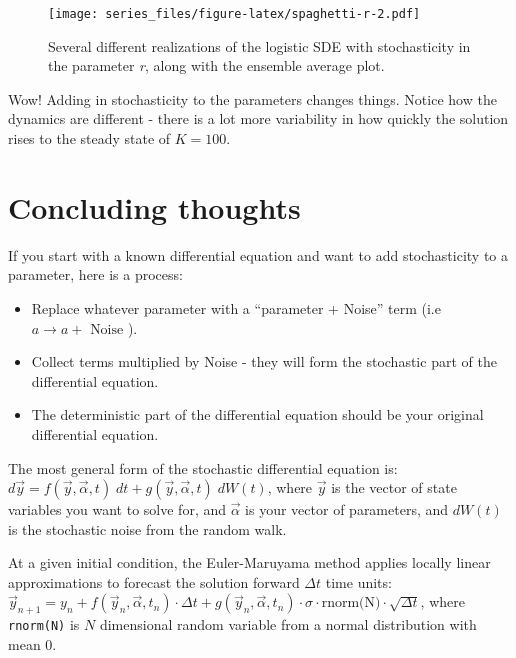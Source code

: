 \documentclass[
]{book}
\providecommand{\tightlist}{%
  \setlength{\itemsep}{0pt}\setlength{\parskip}{0pt}}
\theoremstyle{definition}
\theoremstyle{definition}
\theoremstyle{definition}
\theoremstyle{remark}
\begin{document}
\begin{figure}
\centering
\texttt{[image: series\_files/figure-latex/spaghetti-r-2.pdf]}
\caption{\label{fig:spaghetti-r-2}Several different realizations of the logistic SDE with stochasticity in the parameter \emph{r}, along with the ensemble average plot.}
\end{figure}

Wow! Adding in stochasticity to the parameters changes things. Notice how the dynamics are different - there is a lot more variability in how quickly the solution rises to the steady state of \(K=100\).

\hypertarget{concluding-thoughts-1}{%
\section{Concluding thoughts}\label{concluding-thoughts-1}}

If you start with a known differential equation and want to add stochasticity to a parameter, here is a process:

\begin{itemize}
\tightlist
\item
  Replace whatever parameter with a ``parameter + Noise'' term (i.e \(a \rightarrow a + \mbox{ Noise }\)).
\item
  Collect terms multiplied by Noise - they will form the stochastic part of the differential equation.
\item
  The deterministic part of the differential equation should be your original differential equation.
\end{itemize}

The most general form of the stochastic differential equation is: \(\displaystyle d\vec{y} = f(\vec{y},\vec{\alpha},t) \; dt + g(\vec{y},\vec{\alpha},t) \; dW(t)\), where \(\vec{y}\) is the vector of state variables you want to solve for, and \(\vec{\alpha}\) is your vector of parameters, and \(dW(t)\) is the stochastic noise from the random walk.

At a given initial condition, the Euler-Maruyama method applies locally linear approximations to forecast the solution forward \(\Delta t\) time units: \(\displaystyle \vec{y}_{n+1} = y_{n} + f(\vec{y}_{n},\vec{\alpha},t_{n}) \cdot \Delta t + g(\vec{y}_{n},\vec{\alpha},t_{n}) \cdot \sigma \cdot \mbox{rnorm(N)} \cdot \sqrt{\Delta t}\), where \texttt{rnorm(N)} is \(N\) dimensional random variable from a normal distribution with mean 0.

\newpage
\end{document}

